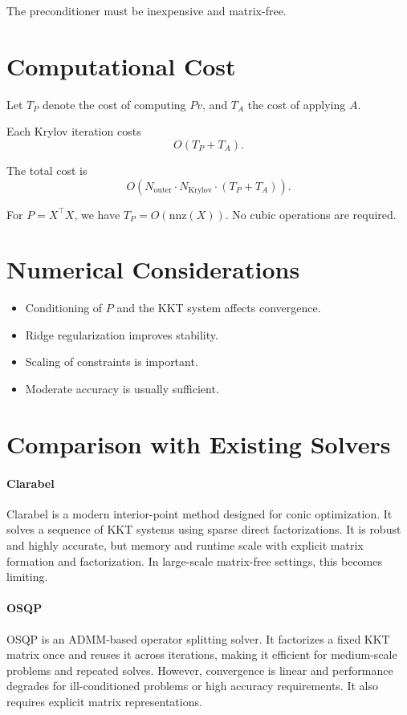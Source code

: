 \documentclass[11pt]{article}
\begin{document}
The preconditioner must be inexpensive and matrix-free.

\section{Computational Cost}

Let \(T_P\) denote the cost of computing \(P v\), and \(T_A\) the cost of applying \(A\).

Each Krylov iteration costs
\[
O(T_P + T_A).
\]

The total cost is
\[
O(N_{\text{outer}} \cdot N_{\text{Krylov}} \cdot (T_P + T_A)).
\]

For \(P = X^\top X\), we have \(T_P = O(\text{nnz}(X))\). No cubic operations are required.

\section{Numerical Considerations}

\begin{itemize}
\item Conditioning of \(P\) and the KKT system affects convergence.
\item Ridge regularization improves stability.
\item Scaling of constraints is important.
\item Moderate accuracy is usually sufficient.
\end{itemize}

\section{Comparison with Existing Solvers}

\paragraph{Clarabel}
Clarabel is a modern interior-point method designed for conic optimization. It solves a sequence of KKT systems using sparse direct factorizations. It is robust and highly accurate, but memory and runtime scale with explicit matrix formation and factorization. In large-scale matrix-free settings, this becomes limiting.

\paragraph{OSQP}
OSQP is an ADMM-based operator splitting solver. It factorizes a fixed KKT matrix once and reuses it across iterations, making it efficient for medium-scale problems and repeated solves. However, convergence is linear and performance degrades for ill-conditioned problems or high accuracy requirements. It also requires explicit matrix representations.
\end{document}
